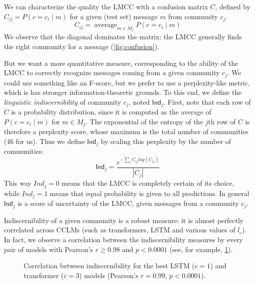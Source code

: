 \documentclass[11pt,a4paper]{article}
\newcommand\Ind{\mathsf{Ind}}
\DeclareMathOperator*{\avg}{average}
\begin{document}
We can characterize the quality the LMCC with a confusion matrix
$C$, defined by $C_{ij} = P(c=c_i \mid m)$ for a given (test set) message $m$ 
from community $c_j$.
\[C_{ij} = \avg_{m\in M_j}P(c=c_i \mid m)\]
We observe that the diagonal dominates the matrix: the LMCC generally finds the right community for a message (\cref{fig:confusion}).
%
\begin{figure*}
\caption{LMCC confusion matrices for the best LSTM (left, $c=1$) and transformer (right, $c=3$) models.}
\label{fig:confusion}
\end{figure*}
%
But we want a more quantitative measure, corresponding to the ability of the LMCC to correctly
recognize messages coming from a given community $c_j$. We could use
something like an F-score, but we prefer to use a perplexity-like metric,
which is has stronger information-theoretic grounds.
To this end, we define the \emph{linguistic indiscernibility} of community $c_j$, 
noted $\Ind_j$. 
First, note that each row of $C$ is a probability distribution,
since it is computed as the average of $P(c=c_i \mid m)$ for $m\in M_j$.
The exponential of the entropy of the $j$th row of \(C\) is therefore a perplexity score,
whose maximum is the total number of communities (46 for us).
Thus we define $\Ind_j$ by scaling this perplexity by the number of communities:
\[\Ind_j = \frac{e^{-\sum_i C_{ij} log(C_{ij})}}{|C_j|}\]
This way $Ind_j=0$ means that the LMCC is completely certain of its
choice, while $Ind_j=1$ means that equal probability is given to all
predictions.  In general $\Ind_j$ is a score of uncertainty of the
LMCC, given messages from a community $c_j$.

Indiscernibility of a given community is a robust measure: it is
almost perfectly correlated across CCLMs (such as transformers, LSTM
and various values of $l_c$).  In fact, we observe a correlation
between the indiscernibility measures by every pair of models with
Pearson's $r \geq 0.98$ and $p < 0.0001$ (see, for example,
\cref{fig:indisc-corr}).

\begin{figure}
  \caption{%
    Correlation between indiscernibility for 
    the best LSTM ($c = 1$) and transformer ($c = 3$) models
    (Pearson's $r = 0.99$, $p < 0.0001$).
  }
  \label{fig:indisc-corr}
\end{figure}
\end{document}
